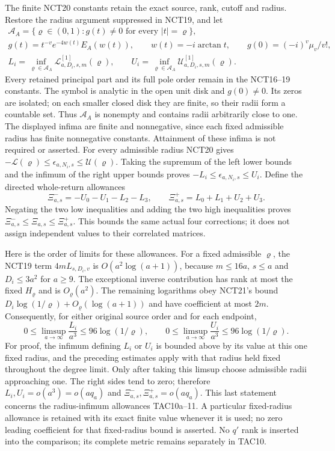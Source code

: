\documentclass[11pt,a4paper]{article}
\begin{document}
The finite NCT20 constants retain the exact source, rank, cutoff and
radius. Restore the radius argument suppressed in NCT19, and let
\[
\begin{gathered}
 \mathcal A_A=\{\varrho\in(0,1):g(t)\ne0\text{ for every }|t|=\varrho\},\\
 g(t)=t^{-v}e^{-4w(t)}E_A(w(t)),\qquad w(t)=-i\arctan t,\qquad
 g(0)=(-i)^v\mu_v/v!,\\
 L_i=\inf_{\varrho\in\mathcal A_A}
          \mathcal L_{a,D_i,s,m}^{[1]}(\varrho),\qquad
 U_i=\inf_{\varrho\in\mathcal A_A}
          \mathcal U_{a,D_i,s,m}^{[1]}(\varrho).
\end{gathered}\tag{TAC10a}
\]
Every retained principal part and its full pole order remain in the
NCT16--19 constants. The symbol is analytic in the open unit disk and
$g(0)\ne0$. Its zeros are isolated; on each smaller closed disk they
are finite, so their radii form a countable set. Thus $\mathcal A_A$
is nonempty and contains radii arbitrarily close to one. The displayed
infima are finite and nonnegative, since each fixed admissible radius
has finite nonnegative constants. Attainment of these infima is not
required or asserted. For every admissible radius NCT20 gives
$-\mathcal L(\varrho)\le\epsilon_{a,N_i,s}\le\mathcal U(\varrho)$.
Taking the supremum of the left lower bounds and the infimum of the
right upper bounds proves $-L_i\le\epsilon_{a,N_i,s}\le U_i$.
Define the directed whole-return allowances
\[
 \Xi^-_{a,s}=-U_0-U_1-L_2-L_3,
 \qquad \Xi^+_{a,s}=L_0+L_1+U_2+U_3.
 \tag{TAC11}
\]
Negating the two low inequalities and adding the two high inequalities
proves $\Xi^-_{a,s}\le\Xi_{a,s}\le\Xi^+_{a,s}$. This bounds the
same actual four corrections; it does not assign independent values to
their correlated matrices.

Here is the order of limits for these allowances. For a fixed admissible
$\varrho$, the NCT19 term $4mL_{s,D_i,v}$ is
$O(a^2\log(a+1))$, because $m\le16a$, $s\le a$ and
$D_i\le3a^2$ for $a\ge9$. The exceptional inverse contribution has
rank at most the fixed $H_\varrho$ and is $O_\varrho(a^2)$.
The remaining logarithms obey NCT21's bound
$D_i\log(1/\varrho)+O_\varrho(\log(a+1))$ and have coefficient
at most $2m$. Consequently, for either original source order and
for each endpoint,
\[
 0\le\limsup_{a\to\infty}\frac{L_i}{a^3}
       \le96\log(1/\varrho),\qquad
 0\le\limsup_{a\to\infty}\frac{U_i}{a^3}
       \le96\log(1/\varrho).
 \tag{TAC11a}
\]
For proof, the infimum defining $L_i$ or $U_i$ is bounded above by its
value at this one fixed radius, and the preceding estimates apply with
that radius held fixed throughout the degree limit. Only after taking
this limsup choose admissible radii approaching one. The right sides
tend to zero; therefore $L_i,U_i=o(a^3)=o(aq_a)$ and
$\Xi^-_{a,s},\Xi^+_{a,s}=o(aq_a)$. This last statement concerns the
radius-infimum allowances TAC10a--11. A particular fixed-radius
allowance is retained with its exact finite value whenever it is used;
no zero leading coefficient for that fixed-radius bound is asserted.
No $q'$ rank is inserted into the comparison; its complete metric
remains separately in TAC10.
\end{document}
